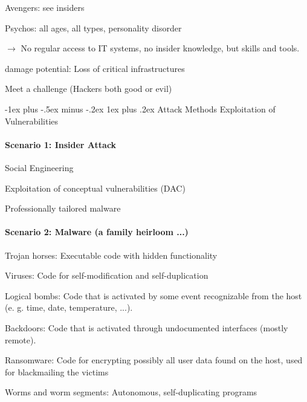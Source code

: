 \documentclass[a4paper]{article}
\makeatletter
\renewcommand{\subsubsection}{\@startsection{subsubsection}{3}{0mm}%
                                {-1ex plus -.5ex minus -.2ex}%
                                {1ex plus .2ex}%
                                {\normalfont\small\bfseries}}
\makeatother
\begin{document}
\begin{multicols}{3}
\begin{itemize*}
\begin{itemize*}
\begin{itemize*}
                \item Avengers: see insiders
                \item Psychos: all ages, all types, personality disorder
                \item $\rightarrow$  No regular access to IT systems, no insider knowledge, but skills and tools.
            \end{itemize*}
            \item damage potential: Loss of critical infrastructures
        \end{itemize*}
        \item Meet a challenge (Hackers both good or evil)
    \end{itemize*}

    \subsubsection{Attack Methods}
    Exploitation of Vulnerabilities

    \paragraph{Scenario 1: Insider Attack}
    \begin{itemize*}
        \item Social Engineering
        \item Exploitation of conceptual vulnerabilities (DAC)
        \item Professionally tailored malware
    \end{itemize*}

    \paragraph{Scenario 2: Malware (a family heirloom ...)}
    \begin{itemize*}
        \item Trojan horses: Executable code with hidden functionality
        \item Viruses: Code for self-modification and self-duplication
        \item Logical bombs: Code that is activated by some event recognizable from the host (e. g. time, date, temperature, ...).
        \item Backdoors: Code that is activated through undocumented interfaces (mostly remote).
        \item Ransomware: Code for encrypting possibly all user data found on the host, used for blackmailing the victims
        \item Worms and worm segments: Autonomous, self-duplicating programs
    \end{itemize*}


\end{multicols}
\end{document}
